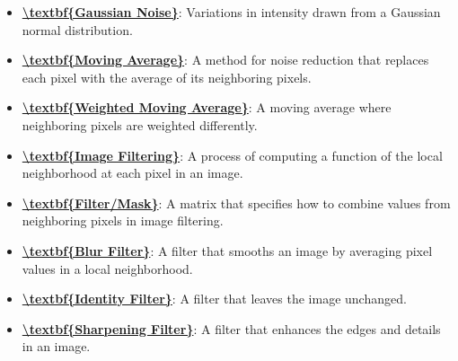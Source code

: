 \documentclass{article}%
\begin{document}
\begin{itemize}[leftmargin=*]
\item \href{https://www.math.purdue.edu/~yipn/351/07L2-Vision.pdf#page=36}{\textbf{\textbackslash{}textbf\{Gaussian Noise\}}}: Variations in intensity drawn from a Gaussian normal distribution.%
\item \href{https://www.math.purdue.edu/~yipn/351/07L2-Vision.pdf#page=38}{\textbf{\textbackslash{}textbf\{Moving Average\}}}: A method for noise reduction that replaces each pixel with the average of its neighboring pixels.%
\item \href{https://www.math.purdue.edu/~yipn/351/07L2-Vision.pdf#page=40}{\textbf{\textbackslash{}textbf\{Weighted Moving Average\}}}: A moving average where neighboring pixels are weighted differently.%
\item \href{https://www.math.purdue.edu/~yipn/351/07L2-Vision.pdf#page=49}{\textbf{\textbackslash{}textbf\{Image Filtering\}}}: A process of computing a function of the local neighborhood at each pixel in an image.%
\item \href{https://www.math.purdue.edu/~yipn/351/07L2-Vision.pdf#page=49}{\textbf{\textbackslash{}textbf\{Filter/Mask\}}}: A matrix that specifies how to combine values from neighboring pixels in image filtering.%
\item \href{https://www.math.purdue.edu/~yipn/351/07L2-Vision.pdf#page=50}{\textbf{\textbackslash{}textbf\{Blur Filter\}}}: A filter that smooths an image by averaging pixel values in a local neighborhood.%
\item \href{https://www.math.purdue.edu/~yipn/351/07L2-Vision.pdf#page=51}{\textbf{\textbackslash{}textbf\{Identity Filter\}}}: A filter that leaves the image unchanged.%
\item \href{https://www.math.purdue.edu/~yipn/351/07L2-Vision.pdf#page=52}{\textbf{\textbackslash{}textbf\{Sharpening Filter\}}}: A filter that enhances the edges and details in an image.%
\end{itemize}%
\end{document}
